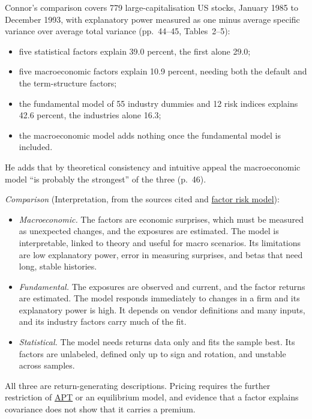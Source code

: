 \begin{qfdefinition}
 Connor's comparison covers 779 large-capitalisation US stocks, January 1985 to December 1993, with explanatory power measured as one minus average specific variance over average total variance (pp.~44--45, Tables~2--5):
\begin{itemize}
\item five statistical factors explain 39.0 percent, the first alone 29.0;
\item five macroeconomic factors explain 10.9 percent, needing both the default and the term-structure factors;
\item the fundamental model of 55 industry dummies and 12 risk indices explains 42.6 percent, the industries alone 16.3;
\item the macroeconomic model adds nothing once the fundamental model is included.
\end{itemize}
He adds that by theoretical consistency and intuitive appeal the macroeconomic model ``is probably the strongest'' of the three (p.~46).

 \emph{Comparison} (Interpretation, from the sources cited and \hyperref[mod:factor-risk-model]{factor risk model}):
\begin{itemize}
\item \emph{Macroeconomic.} The factors are economic surprises, which must be measured as unexpected changes, and the exposures are estimated. The model is interpretable, linked to theory and useful for macro scenarios. Its limitations are low explanatory power, error in measuring surprises, and betas that need long, stable histories.
\item \emph{Fundamental.} The exposures are observed and current, and the factor returns are estimated. The model responds immediately to changes in a firm and its explanatory power is high. It depends on vendor definitions and many inputs, and its industry factors carry much of the fit.
\item \emph{Statistical.} The model needs returns data only and fits the sample best. Its factors are unlabeled, defined only up to sign and rotation, and unstable across samples.
\end{itemize}

All three are return-generating descriptions. Pricing requires the further restriction of \hyperref[mod:multifactor-apt]{APT} or an equilibrium model, and evidence that a factor explains covariance does not show that it carries a premium.


\end{qfdefinition}
